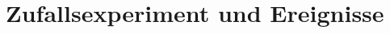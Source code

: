 \documentclass[
	ngerman,		%
	footnotes=multiple,
	parskip=half,
	numbers=noendperiod,
    11pt
]{scrartcl}
\begin{document}
\newcommand{\CurrentSectionNumber}{1}
\setcounter{section}{\CurrentSectionNumber-1}
\section{Zufallsexperiment und Ereignisse}





\end{document}
